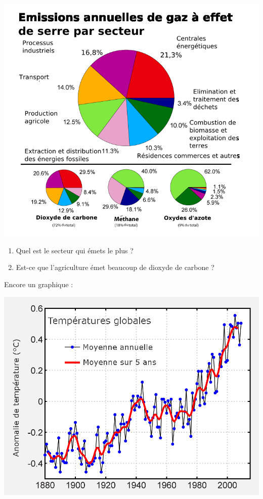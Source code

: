 \includegraphics[width=17cm]{Emission_de_GES.png}

\begin{enumerate}
    \item
        Quel est le secteur qui émets le plus ?
    \item
        Est-ce que l'agriculture émet beaucoup de dioxyde de carbone ?
\end{enumerate}

Encore un graphique :

\includegraphics[width=17cm]{Instrumental_Temperature_Record_fr.png}

